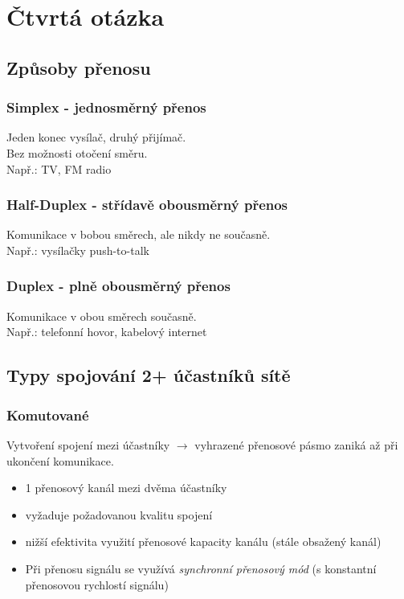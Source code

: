 \chapter{Čtvrtá otázka}
\section{Způsoby přenosu}
\subsection{Simplex - jednosměrný přenos}
Jeden konec vysílač, druhý přijímač.\\
Bez možnosti otočení směru.\\ 
Např.: TV, FM radio
\subsection{Half-Duplex - střídavě obousměrný přenos}
Komunikace v bobou směrech, ale nikdy ne současně.\\
Např.: vysílačky push-to-talk
\subsection{Duplex - plně obousměrný přenos}
Komunikace v obou směrech současně.\\
Např.: telefonní hovor, kabelový internet
\section{Typy spojování 2+ účastníků sítě}
\subsection{Komutované}
Vytvoření spojení mezi účastníky $\rightarrow$ vyhrazené přenosové pásmo zaniká až při ukončení komunikace.
\begin{itemize}
	\item 1 přenosový kanál mezi dvěma účastníky
	\item vyžaduje požadovanou kvalitu spojení
	\item nižší efektivita využití přenosové kapacity kanálu (stále obsažený kanál)
	\item Při přenosu signálu se využívá \textit{synchronní přenosový mód} (s konstantní přenosovou rychlostí signálu)
\end{itemize}
